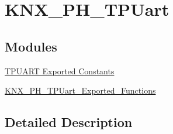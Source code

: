 \hypertarget{group___k_n_x___p_h___t_p_uart}{}\section{K\+N\+X\+\_\+\+P\+H\+\_\+\+T\+P\+Uart}
\label{group___k_n_x___p_h___t_p_uart}
\subsection*{Modules}
\begin{DoxyCompactItemize}
\item 
\hyperlink{group___k_n_x___p_h___t_p_uart___exported___constants}{T\+P\+U\+A\+R\+T Exported Constants}
\item 
\hyperlink{group___k_n_x___p_h___t_p_uart___exported___functions}{K\+N\+X\+\_\+\+P\+H\+\_\+\+T\+P\+Uart\+\_\+\+Exported\+\_\+\+Functions}
\end{DoxyCompactItemize}


\subsection{Detailed Description}
